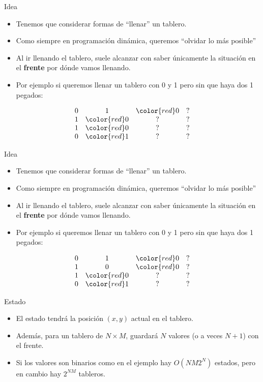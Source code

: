 \documentclass{beamer}
\begin{document}
\begin{frame}{Idea}
    \begin{itemize}
		\item Tenemos que considerar formas de ``llenar'' un tablero.
		\item Como siempre en programación dinámica, queremos ``olvidar lo más posible''
		\item Al ir llenando el tablero, suele alcanzar con saber únicamente la situación en el \textbf{frente} por dónde vamos llenando.
		\item Por ejemplo si queremos llenar un tablero con 0 y 1 pero sin que haya dos 1 pegados:
    \end{itemize}
    $$\begin{array}{cccc}
		0 & 1 & \color{red}0 & ? \\
		1 & \color{red}0 & ? & ? \\
		1 & \color{red}0 & ? & ? \\
		0 & \color{red}1 & ? & ? \\
    \end{array}$$
\end{frame}

\begin{frame}{Idea}
    \begin{itemize}
		\item Tenemos que considerar formas de ``llenar'' un tablero.
		\item Como siempre en programación dinámica, queremos ``olvidar lo más posible''
		\item Al ir llenando el tablero, suele alcanzar con saber únicamente la situación en el \textbf{frente} por dónde vamos llenando.
		\item Por ejemplo si queremos llenar un tablero con 0 y 1 pero sin que haya dos 1 pegados:
    \end{itemize}
    $$\begin{array}{cccc}
		0 & 1 & \color{red}0 & ? \\
		1 & 0 & \color{red}0 & ? \\
		1 & \color{red}0 & ? & ? \\
		0 & \color{red}1 & ? & ? \\
    \end{array}$$
\end{frame}

\begin{frame}{Estado}
    \begin{itemize}
		\item El estado tendrá la posición $(x,y)$ actual en el tablero.
		\item Además, para un tablero de $N \times M$, guardará $N$ valores (o a veces $N+1$) con el frente.
		\item Si los valores son binarios como en el ejemplo hay $O(NM2^N)$ estados, pero en cambio hay $2^{NM}$ tableros.
	\end{itemize}
\end{frame}
\end{document}
